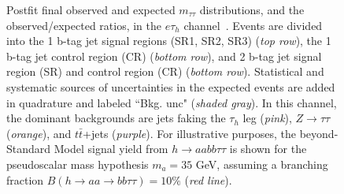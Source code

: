 \begin{figure}[ht]
\begin{center}
    \end{center}
    \caption[Postfit final observed and expected $m_{\tau\tau}$ distributions in the $e\tau_{h}$ channel, for the 1 b-tag jet and 2 b-tag jet signal and control regions.]{Postfit final observed and expected $m_{\tau\tau}$ distributions, and the observed/expected ratios, in the $e\tau_{h}$ channel~\cite{CMS-AN-20-213}. Events are divided into the 1 b-tag jet signal regions (SR1, SR2, SR3) (\textit{top row}), the 1 b-tag jet control region (CR) (\textit{bottom row}), and 2 b-tag jet signal region (SR) and control region (CR) (\textit{bottom row}). Statistical and systematic sources of uncertainties in the expected events are added in quadrature and labeled ``Bkg. unc" (\textit{shaded gray}). In this channel, the dominant backgrounds are jets faking the $\tau_{h}$ leg (\textit{pink}), $Z \rightarrow \tau\tau$ (\textit{orange}), and $t\bar{t}$+jets (\textit{purple}). For illustrative purposes, the beyond-Standard Model signal yield from $h\rightarrow aa bb\tau\tau$ is shown for the pseudoscalar mass hypothesis $m_a = 35$ GeV, assuming a branching fraction $B(h \rightarrow aa \rightarrow bb\tau\tau) = 10\%$ (\textit{red line}).}
    \label{fig:results_mtt_postfit_etall}
\end{figure}

